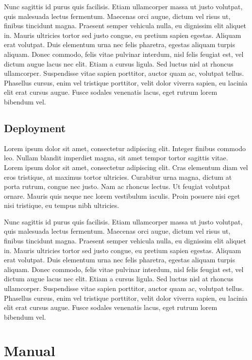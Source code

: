 \documentclass[
  digital,     %
  oneside,     %
  nosansbold,  %
  nocolorbold, %
  lof,         %
  lot,         %
]{fithesis4}
\begin{document}
Nunc sagittis id purus quis facilisis. Etiam ullamcorper massa ut justo volutpat, quis malesuada lectus fermentum. Maecenas orci augue, dictum vel risus ut, finibus tincidunt magna. Praesent semper vehicula nulla, eu dignissim elit aliquet in. Mauris ultricies tortor sed justo congue, eu pretium sapien egestas. Aliquam erat volutpat. Duis elementum urna nec felis pharetra, egestas aliquam turpis aliquam. Donec commodo, felis vitae pulvinar interdum, nisl felis feugiat est, vel dictum augue lacus nec elit. Etiam a cursus ligula. Sed luctus nisl at rhoncus ullamcorper. Suspendisse vitae sapien porttitor, auctor quam ac, volutpat tellus. Phasellus cursus, enim vel tristique porttitor, velit dolor viverra sapien, eu lacinia elit erat cursus augue. Fusce sodales venenatis lacus, eget rutrum lorem bibendum vel.

\section{Deployment}
Lorem ipsum dolor sit amet, consectetur adipiscing elit. Integer finibus commodo leo. Nullam blandit imperdiet magna, sit amet tempor tortor sagittis vitae. Lorem ipsum dolor sit amet, consectetur adipiscing elit. Cras elementum diam vel eros tristique, at maximus tortor ultricies. Curabitur urna magna, dictum at porta rutrum, congue nec justo. Nam ac rhoncus lectus. Ut feugiat volutpat ornare. Mauris quis neque nec lorem vestibulum iaculis. Proin posuere nisi eget nisi tristique, eu tempus nibh ultricies.

Nunc sagittis id purus quis facilisis. Etiam ullamcorper massa ut justo volutpat, quis malesuada lectus fermentum. Maecenas orci augue, dictum vel risus ut, finibus tincidunt magna. Praesent semper vehicula nulla, eu dignissim elit aliquet in. Mauris ultricies tortor sed justo congue, eu pretium sapien egestas. Aliquam erat volutpat. Duis elementum urna nec felis pharetra, egestas aliquam turpis aliquam. Donec commodo, felis vitae pulvinar interdum, nisl felis feugiat est, vel dictum augue lacus nec elit. Etiam a cursus ligula. Sed luctus nisl at rhoncus ullamcorper. Suspendisse vitae sapien porttitor, auctor quam ac, volutpat tellus. Phasellus cursus, enim vel tristique porttitor, velit dolor viverra sapien, eu lacinia elit erat cursus augue. Fusce sodales venenatis lacus, eget rutrum lorem bibendum vel.


\chapter{Manual}
\shorthandoff{-}
\end{document}
